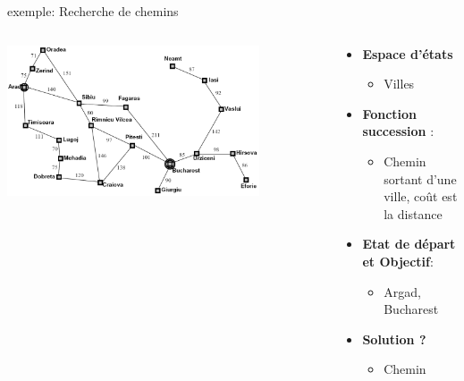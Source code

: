 \documentclass{beamer}
\begin{document}
\begin{frame}[t]{exemple: Recherche de chemins}
 \begin{columns}
   \begin{column}{0.7\textwidth}
    \centering 
    \includegraphics[width=0.8\textwidth,height=0.7\textheight]{./images/worlmap_model.png}
   \end{column}
   \begin{column}{0.3\textwidth}
     \begin{itemize}
       \scriptsize
     \item<1-> \textbf{Espace d'états}
         \begin{itemize}
           \item<2-> \alert{Villes}
         \end{itemize}
       \item<3-> \textbf{Fonction succession} :
         \begin{itemize}
           \tiny
           \item<4-> \alert{Chemin sortant d'une ville, coût est la distance}
         \end{itemize}
       \item<5-> \textbf{Etat de départ et Objectif}:
          \begin{itemize}
            \scriptsize
            \item<6-> \alert{Argad, Bucharest}
          \end{itemize}
        \item<6-> \textbf{Solution ?} 
          \begin{itemize}
            \scriptsize
            \item<7-> \alert{Chemin}
          \end{itemize}
     \end{itemize}
   \end{column}
 \end{columns} 
\end{frame}
\end{document}
